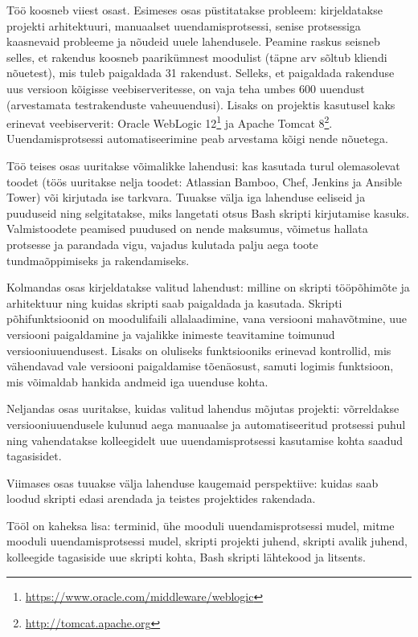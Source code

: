 \documentclass[12pt]{article}
\begin{document}
  Töö koosneb viiest osast. Esimeses osas püstitatakse probleem: kirjeldatakse projekti arhitektuuri, manuaalset uuendamisprotsessi, senise protsessiga kaasnevaid probleeme ja nõudeid uuele lahendusele. Peamine raskus seisneb selles, et rakendus koosneb paarikümnest moodulist (täpne arv sõltub kliendi nõuetest), mis tuleb paigaldada 31 rakendust. Selleks, et paigaldada rakenduse uus versioon kõigisse veebiserveritesse, on vaja teha umbes 600 uuendust (arvestamata testrakenduste vaheuuendusi). Lisaks on projektis kasutusel kaks erinevat veebiserverit: Oracle WebLogic 12\footnote{\url{https://www.oracle.com/middleware/weblogic}} ja Apache Tomcat 8\footnote{\url{http://tomcat.apache.org}}. Uuendamisprotsessi automatiseerimine peab arvestama kõigi nende nõuetega.
  
  Töö teises osas uuritakse võimalikke lahendusi: kas kasutada turul olemasolevat toodet (töös uuritakse nelja toodet: Atlassian Bamboo, Chef, Jenkins ja Ansible Tower) või kirjutada ise tarkvara. Tuuakse välja iga lahenduse eeliseid ja puuduseid ning selgitatakse, miks langetati otsus Bash skripti kirjutamise kasuks. Valmistoodete peamised puudused on nende maksumus, võimetus hallata protsesse ja parandada vigu, vajadus kulutada palju aega toote tundmaõppimiseks ja rakendamiseks.
  
  Kolmandas osas kirjeldatakse valitud lahendust: milline on skripti tööpõhimõte ja arhitektuur ning kuidas skripti saab paigaldada ja kasutada. Skripti põhifunk\-tsioonid on moodulifaili allalaadimine, vana versiooni mahavõtmine, uue versiooni paigaldamine ja vajalikke inimeste teavitamine toimunud versiooniuuendusest. Lisaks on oluliseks funktsiooniks erinevad kontrollid, mis vähendavad vale versiooni paigaldamise tõenäosust, samuti logimis funktsioon, mis võimaldab hankida andmeid iga uuenduse kohta.
  
  Neljandas osas uuritakse, kuidas valitud lahendus mõjutas projekti: võrreldakse versiooniuuendusele kulunud aega manuaalse ja automatiseeritud protsessi puhul ning vahendatakse kolleegidelt uue uuendamisprotsessi kasutamise kohta saadud tagasisidet.
  
  Viimases osas tuuakse välja lahenduse kaugemaid perspektiive: kuidas saab loodud skripti edasi arendada ja teistes projektides rakendada.
  
  Tööl on kaheksa lisa: terminid, ühe mooduli uuendamisprotsessi mudel, mitme mooduli uuendamisprotsessi mudel, skripti projekti juhend, skripti avalik juhend, kolleegide tagasiside uue skripti kohta, Bash skripti lähtekood ja litsents.
  
\end{document}
